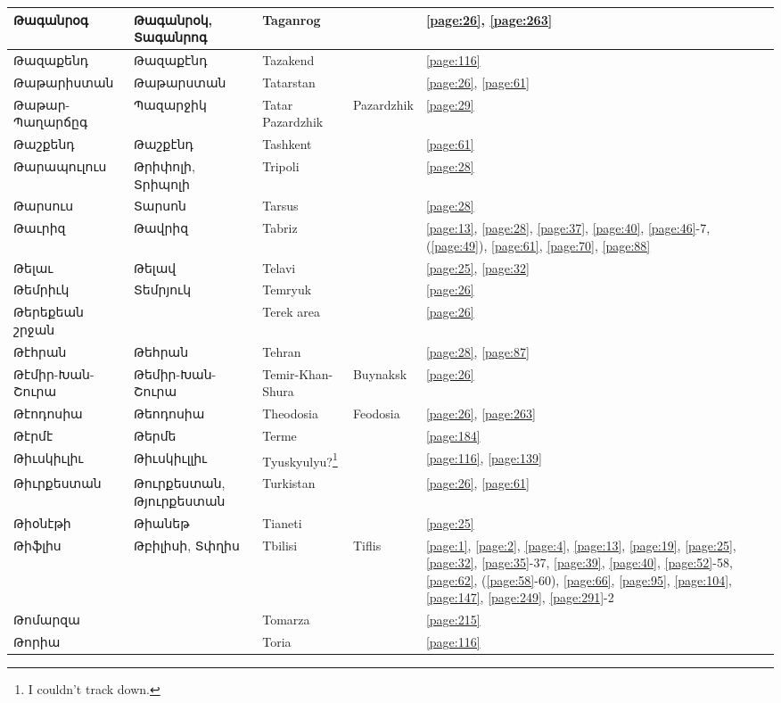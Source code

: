 \begin{center}
\begin{longtable}{|p{}|p{3cm}|p{3cm}|p{2cm}|p{3cm}|}
Թագանրօգ&Թագանրօկ, Տագանրոգ &Taganrog  & &\ref{page:26}, \ref{page:263}\\ \hline
Թազաքենդ&Թազաքէնդ & Tazakend& &\ref{page:116}\\ \hline
Թաթարիստան&Թաթարստան &  Tatarstan& &\ref{page:26}, \ref{page:61}\\ \hline
Թաթար-Պաղարճըգ&Պազարջիկ  &Tatar Pazardzhik &  Pazardzhik  &\ref{page:29}\\ \hline
Թաշքենդ& Թաշքէնդ&Tashkent & &\ref{page:61}\\ \hline
Թարապուլուս&Թրիփոլի,    Տրիպոլի  & Tripoli& &\ref{page:28}\\ \hline
Թարսուս&  Տարսոն& Tarsus& &\ref{page:28}\\ \hline
Թաւրիզ&Թավրիզ & Tabriz& &\ref{page:13}, \ref{page:28}, \ref{page:37}, \ref{page:40}, \ref{page:46}-7, (\ref{page:49}), \ref{page:61}, \ref{page:70}, \ref{page:88}\\ \hline
Թելաւ& Թելավ& Telavi& &\ref{page:25}, \ref{page:32}\\ \hline
Թեմրիւկ&Տեմրյուկ &Temryuk & &\ref{page:26}\\ \hline
Թերեքեան շրջան& &Terek area & &\ref{page:26}\\ \hline
Թէհրան& Թեհրան& Tehran& &\ref{page:28}, \ref{page:87}\\ \hline
Թէմիր-Խան-Շուրա&Թեմիր-Խան-Շուրա &Temir-Khan-Shura &Buynaksk &\ref{page:26}\\ \hline
Թէոդոսիա& Թեոդոսիա& Theodosia  &  Feodosia &\ref{page:26}, \ref{page:263}\\ \hline
Թէրմէ& Թերմե& Terme& &\ref{page:184}\\ \hline
Թիւսկիւլիւ&Թիւսկիւլլիւ & Tyuskyulyu?\footnote{I couldn't track down.}& &\ref{page:116}, \ref{page:139}\\ \hline
Թիւրքեստան& Թուրքեստան, Թյուրքեստան& Turkistan& &\ref{page:26}, \ref{page:61}\\ \hline
Թիօնէթի & Թիանեթ & Tianeti& &\ref{page:25}\\ \hline
Թիֆլիս&Թբիլիսի, Տփղիս &
Tbilisi& Tiflis&\ref{page:1}, \ref{page:2}, \ref{page:4}, \ref{page:13}, \ref{page:19}, \ref{page:25}, \ref{page:32}, \ref{page:35}-37, \ref{page:39}, \ref{page:40}, \ref{page:52}-58, \ref{page:62}, (\ref{page:58}-60), \ref{page:66}, \ref{page:95}, \ref{page:104}, \ref{page:147}, \ref{page:249}, \ref{page:291}-2\\ \hline
Թոմարզա& &Tomarza & &\ref{page:215}\\ \hline
Թորիա& &Toria & &\ref{page:116}\\ \hline

\end{longtable}
\end{center}
